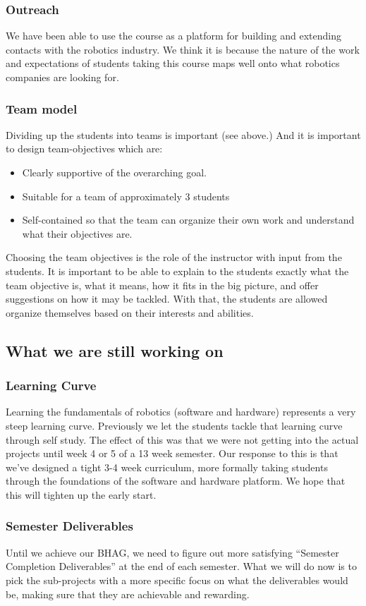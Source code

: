 \subsubsection{Outreach} We have been able to use the course as a platform for building and extending contacts with the robotics industry. We think it is because the nature of the work and expectations of students taking this course maps well onto what robotics companies are looking for.
\subsubsection{Team model}Dividing up the students into teams is important (see above.) And it is important to design team-objectives which are:
\begin{itemize}
\item Clearly supportive of the overarching goal.
\item Suitable for a team of approximately 3 students
\item Self-contained so that the team can organize their own work and understand what their objectives are.
\end{itemize}
Choosing the team objectives is the role of the instructor with input from the students. It is important to be able to explain to the students exactly what the team objective is, what it means, how it fits in the big picture, and offer suggestions on how it may be tackled. With that, the students are allowed organize themselves based on their interests and abilities.

\subsection{What we are still working on}
\subsubsection{Learning Curve}Learning the fundamentals of robotics (software and hardware) represents a very steep learning curve. Previously we let the students tackle that learning curve through self study. The effect of this was that we were not getting into the actual projects until week 4 or 5 of a 13 week semester. Our response to this is that we've designed a tight 3-4 week curriculum, more formally taking students through the foundations of the software and hardware platform. We hope that this will tighten up the early start.
\subsubsection{Semester Deliverables}Until we achieve our BHAG, we need to figure out more satisfying ``Semester Completion Deliverables'' at the end of each semester. What we will do now is to pick the sub-projects with a more specific focus on what the deliverables would be, making sure that they are achievable and rewarding.

